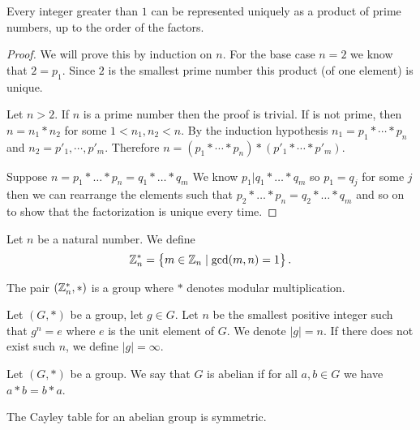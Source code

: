 \documentclass[11pt,a4paper]{article}
\begin{document}
  \begin{proposition}
    Every integer greater than $1$ can be represented uniquely as a product of
    prime numbers, up to the order of the factors.
  \end{proposition}
  \begin{proof}
    We will prove this by induction on $n$.
  	For the base case $n = 2$ we know that $2 = p_1$.
    Since $2$ is the smallest prime number this product (of one element) is
    unique.

	  Let $n > 2$.
    If $n$ is a prime number then the proof is trivial.
    If is not prime, then $n = n_1 * n_2$ for some $1 < n_1, n_2 < n$. 
    By the induction hypothesis $n_1 = p_1 * \cdots * p_n$ and 
    $n_2 = p'_1, \cdots, p'_m$. 
    Therefore $n = (p_1 * \cdots * p_n) * (p'_1 * \cdots * p'_m)$.

    Suppose $n = p_1*\ldots *p_n=q_1*\ldots *q_m$
    We know $p_1|q_1*\ldots *q_m$ so $p_1=q_j$ for some $j$ 
    then we can rearrange the elements such that 
    $p_2*\ldots *p_n = q_2*\ldots *q_m$ and so on to show that
    the factorization is unique every time.
  \end{proof}
	
  \begin{definition}
    Let $n$ be a natural number.
    We define
    \[
      \mathbb{Z}^*_n = \set{m \in \mathbb{Z}_n \mid \gcd(m,n) = 1}.
    \]
  \end{definition}
  \begin{proposition}
    The pair $(\mathbb{Z}^*_n, *)$ is a group where $*$ denotes modular multiplication.
  \end{proposition}

  \begin{definition}
    Let $(G,*)$ be a group, let $g \in G$.
    Let $n$ be the smallest positive integer such that $g^n = e$ where
    $e$ is the unit element of $G$. We denote $|g| = n$.
    If there does not exist such $n$, we define $|g| = \infty$.
  \end{definition}
  
  \begin{definition}
    Let $(G,*)$ be a group. We say that $G$ is abelian if for all $a,b \in G$
    we have $a * b = b * a$.
  \end{definition}
  \begin{remark}
  	The Cayley table for an abelian group is symmetric.
  \end{remark}
\end{document}
